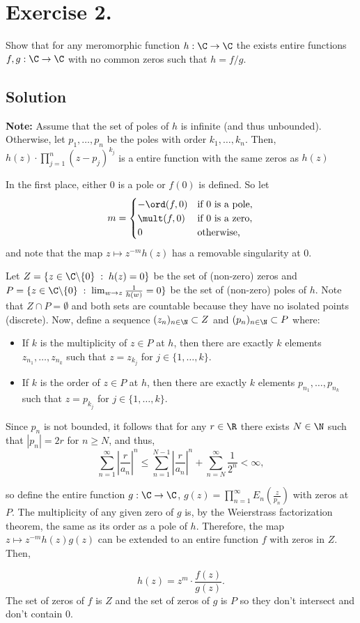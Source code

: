 
\section{Exercise 2.}

Show that for any meromorphic function $h:\C \to \C$ the exists entire functions $f,g: \C \to \C$ with no common zeros such that $h = f/g$.

\subsection*{Solution}

\textbf{Note:} Assume that the set of poles of $h$ is infinite (and thus unbounded). Otherwise, let $p_1,\ldots, p_n$ be the poles with order $k_1,\ldots, k_n$. Then, $h(z) \cdot \prod_{j = 1}^n(z-p_j)^{k_j}$ is a entire function with the same zeros as $h(z)$

In the first place, either 0 is a pole or $f(0)$ is defined. So let
\[ m = \begin{cases}
    -\ord(f,0) & \mbox{if 0 is a pole},\\
    \mult(f,0) & \mbox{if 0 is a zero},\\
    0 & \mbox{otherwise,}
\end{cases} \]
and note that the map $z\mapsto z^{-m} h(z)$ has a removable singularity at 0.

Let $Z = \{z\in \C\backslash\{0\} \;:\; h(z) = 0\} $ be the set of (non-zero) zeros and $P = \{z\in \C\backslash\{0\} \;:\; \lim_{w\to z}\frac{1}{h(w)} = 0\}$ be the set of (non-zero) poles of $h$. Note that $Z \cap P = \emptyset$ and both sets are countable because they have no isolated points (discrete). 
Now, define a sequence $(z_n)_{n\in \N} \subset Z$ and $(p_n)_{n\in \N} \subset P$ where: 
\begin{itemize}
    \item If $k$ is the multiplicity of $z\in P$ at $h$, then there are exactly $k$ elements $z_{n_1},\ldots, z_{n_k}$ such that $z = z_{k_j}$ for $j\in\{1,\ldots, k\}$.
    \item If $k$ is the order of $z\in P$ at $h$, then there are exactly $k$ elements $p_{n_1},\ldots, p_{n_k}$ such that $z = p_{k_j}$ for $j\in\{1,\ldots, k\}$.
\end{itemize}
Since $p_n$ is not bounded, it follows that for any $r\in \R$ there exists $N\in \N$ such that $|p_n| = 2r$ for $n \geq N$, and thus, 
\[ \sum_{n = 1}^{\infty} \left| \frac{r}{a_n} \right|^n \leq \sum_{n = 1}^{N-1} \left| \frac{r}{a_n} \right|^n + \sum_{n = N}^{\infty} \frac{1}{2^n } < \infty,\]

so define the entire function $g:\C\to \C$, $g(z) = \prod_{n = 1}^{\infty} E_n\left( \frac{z}{p_n} \right)$ with zeros at $P$. The multiplicity of any given zero of $g$ is, by the Weierstrass factorization theorem, the same as its order as a pole of $h$. Therefore, the map $z \mapsto z^{-m} h(z) g(z)$ can be extended to an entire function $f$ with zeros in $Z$. Then,

\[ h(z) = z^m \cdot \frac{f(z)}{g(z)}. \]
The set of zeros of $f$ is $Z$ and the set of zeros of $g$ is $P$ so they don't intersect and don't contain 0.